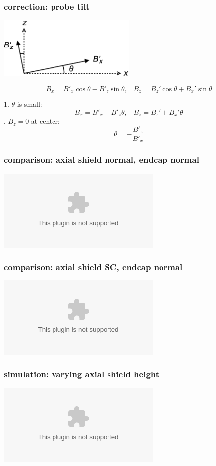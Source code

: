 \documentclass[handout]{beamer}
\newcommand{\pyplot}{\includegraphics[width=\textwidth, trim=60px 60px 60px 40px]}
\begin{document}
\begin{frame}
\frametitle{correction: probe tilt}
    
    \begin{center}
        \includegraphics[width=0.5\textwidth]{figures/probe_tilt.eps}
    \end{center} \pause
    \begin{equation}
        B_x = B'_x \cos\theta - B'_z \sin\theta, \;\;\; B_z = B_z' \cos\theta + B_x' \sin\theta
    \end{equation}

    \pause

    \bigskip

    1. $\theta$ is small: \pause
    \begin{equation*}
        B_x = B'_x - B'_z \theta, \;\;\; B_z = B_z' + B_x' \theta
    \end{equation*} . $B_z = 0$ at center: \pause
    \begin{equation*}
        \theta = -\frac{B'_z}{B'_x}
    \end{equation*}

\end{frame}

\begin{frame}
\frametitle{comparison: axial shield normal, endcap normal}

    \begin{center}
        \pyplot{figures/normnorm_comp.eps}
    \end{center}
    
\end{frame}

\begin{frame}
\frametitle{comparison: axial shield SC, endcap normal}

    \begin{center}
        \pyplot{figures/SCnorm_comp_new.eps}
    \end{center}
    
\end{frame}

\begin{frame}
\frametitle{simulation: varying axial shield height}

    \begin{center}
        \pyplot{figures/axial_effect.eps}
    \end{center}

\end{frame}
\end{document}
